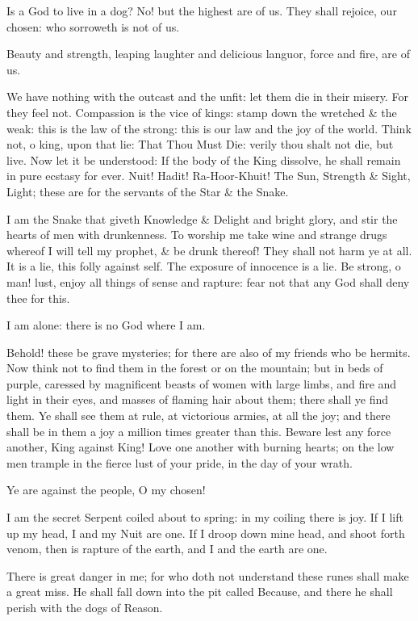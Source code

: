 Is a God to live in a dog? No! but the highest are of us. They shall rejoice, our chosen: who sorroweth is not of us.

Beauty and strength, leaping laughter and delicious languor, force and fire, are of us.

We have nothing with the outcast and the unfit: let them die in their misery. For they feel not. Compassion is the vice of kings: stamp down the wretched \& the weak: this is the law of the strong: this is our law and the joy of the world. Think not, o king, upon that lie: That Thou Must Die: verily thou shalt not die, but live. Now let it be understood: If the body of the King dissolve, he shall remain in pure ecstasy for ever. Nuit! Hadit! Ra-Hoor-Khuit! The Sun, Strength \& Sight, Light; these are for the servants of the Star \& the Snake.

I am the Snake that giveth Knowledge \& Delight and bright glory, and stir the hearts of men with drunkenness. To worship me take wine and strange drugs whereof I will tell my prophet, \& be drunk thereof! They shall not harm ye at all. It is a lie, this folly against self. The exposure of innocence is a lie. Be strong, o man! lust, enjoy all things of sense and rapture: fear not that any God shall deny thee for this.

I am alone: there is no God where I am.

Behold! these be grave mysteries; for there are also of my friends who be hermits. Now think not to find them in the forest or on the mountain; but in beds of purple, caressed by magnificent beasts of women with large limbs, and fire and light in their eyes, and masses of flaming hair about them; there shall ye find them. Ye shall see them at rule, at victorious armies, at all the joy; and there shall be in them a joy a million times greater than this. Beware lest any force another, King against King! Love one another with burning hearts; on the low men trample in the fierce lust of your pride, in the day of your wrath.

Ye are against the people, O my chosen!

I am the secret Serpent coiled about to spring: in my coiling there is joy. If I lift up my head, I and my Nuit are one. If I droop down mine head, and shoot forth venom, then is rapture of the earth, and I and the earth are one.

There is great danger in me; for who doth not understand these runes shall make a great miss. He shall fall down into the pit called Because, and there he shall perish with the dogs of Reason.

